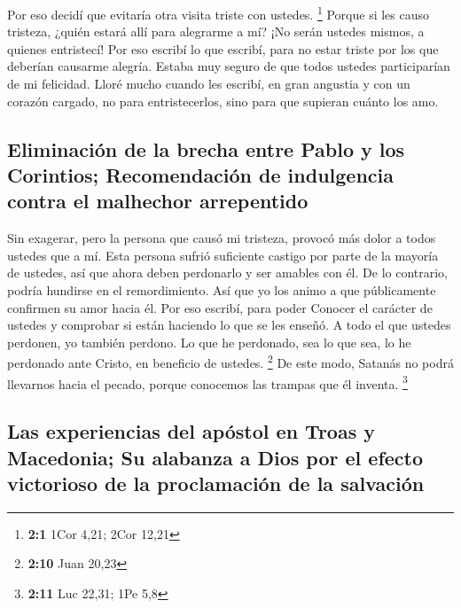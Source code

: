  Por eso decidí que evitaría otra visita triste con
ustedes. \footnote{\textbf{2:1} 1Cor 4,21; 2Cor 12,21} 
Porque si les causo tristeza, ¿quién estará allí para alegrarme a mí?
¡No serán ustedes mismos, a quienes entristecí!  Por eso
escribí lo que escribí, para no estar triste por los que deberían
causarme alegría. Estaba muy seguro de que todos ustedes participarían
de mi felicidad.  Lloré mucho cuando les escribí, en gran
angustia y con un corazón cargado, no para entristecerlos, sino para que
supieran cuánto los amo.

\hypertarget{eliminaciuxf3n-de-la-brecha-entre-pablo-y-los-corintios-recomendaciuxf3n-de-indulgencia-contra-el-malhechor-arrepentido}{%
\subsection{Eliminación de la brecha entre Pablo y los Corintios;
Recomendación de indulgencia contra el malhechor
arrepentido}\label{eliminaciuxf3n-de-la-brecha-entre-pablo-y-los-corintios-recomendaciuxf3n-de-indulgencia-contra-el-malhechor-arrepentido}}

 Sin exagerar, pero la persona que causó mi tristeza,
provocó más dolor a todos ustedes que a mí.  Esta persona
sufrió suficiente castigo por parte de la mayoría de ustedes,
 así que ahora deben perdonarlo y ser amables con él. De
lo contrario, podría hundirse en el remordimiento.  Así
que yo los animo a que públicamente confirmen su amor hacia él.
 Por eso escribí, para poder Conocer el carácter de
ustedes y comprobar si están haciendo lo que se les enseñó.
 A todo el que ustedes perdonen, yo también perdono. Lo
que he perdonado, sea lo que sea, lo he perdonado ante Cristo, en
beneficio de ustedes. \footnote{\textbf{2:10} Juan 20,23}
 De este modo, Satanás no podrá llevarnos hacia el
pecado, porque conocemos las trampas que él inventa. \footnote{\textbf{2:11}
  Luc 22,31; 1Pe 5,8}

\hypertarget{las-experiencias-del-apuxf3stol-en-troas-y-macedonia-su-alabanza-a-dios-por-el-efecto-victorioso-de-la-proclamaciuxf3n-de-la-salvaciuxf3n}{%
\subsection{Las experiencias del apóstol en Troas y Macedonia; Su
alabanza a Dios por el efecto victorioso de la proclamación de la
salvación}\label{las-experiencias-del-apuxf3stol-en-troas-y-macedonia-su-alabanza-a-dios-por-el-efecto-victorioso-de-la-proclamaciuxf3n-de-la-salvaciuxf3n}}

